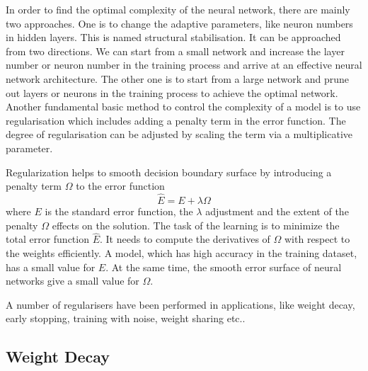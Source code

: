 In order to find the optimal complexity of the neural network, there are mainly two approaches. One is to change the adaptive parameters, like neuron numbers in hidden layers. This is named structural stabilisation. It can be approached from two directions. We can start from a small network and increase the layer number or neuron number in the training process and arrive at an effective neural network architecture. The other one is to start from a large network and prune out layers or neurons in the training process to achieve the optimal network. Another fundamental basic method to control the complexity of a model is to use regularisation which includes adding a penalty term in the error function. The degree of regularisation can be adjusted by scaling the term via a multiplicative parameter.

Regularization helps to smooth decision boundary surface by introducing a penalty term $\Omega$ to the error function
\begin{equation}\label{eq:Regularization}
\hat{E} = E + \lambda\Omega
\end{equation}
where $E$ is the standard error function, the $\lambda$ adjustment and the extent of the penalty $\Omega$ effects on the solution. The task of the learning is to minimize the total error function $\hat{E}$. It needs to compute the derivatives of $\Omega$ with respect to the weights efficiently. A model, which has high accuracy in the training dataset, has a small value for $E$. At the same time, the smooth error surface of neural networks give a small value for $\Omega$.

A number of regularisers have been performed in applications, like weight decay, early stopping, training with noise, weight sharing etc..

\subsection{Weight Decay}

